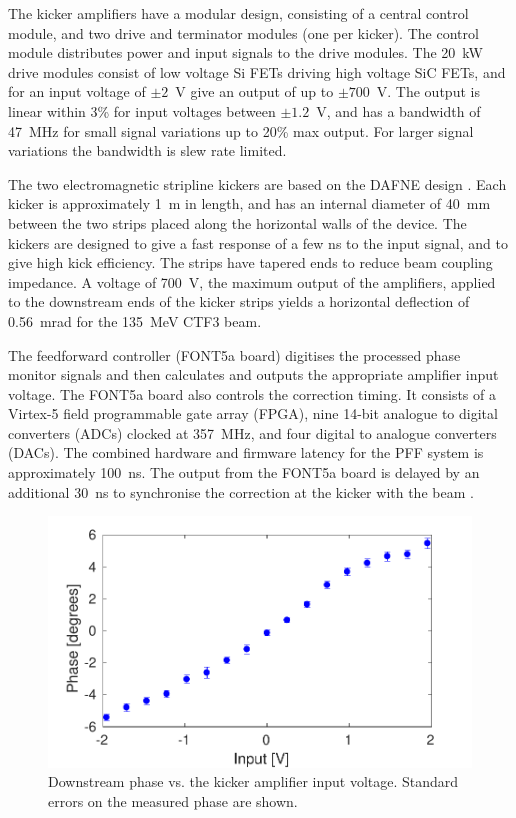 \documentclass[%
 reprint,
 superscriptaddress,
 amsmath,
 amssymb,
 prl,
]{revtex4-1}
\begin{document}
The kicker amplifiers \cite{RobertsThesis} have a modular design, 
consisting of a central control module, and two drive and terminator modules 
(one per kicker). The control module distributes power and input signals to the 
drive modules. The 20~kW drive modules consist of low voltage Si FETs driving 
high voltage SiC FETs, and for an input voltage of \(\pm2\)~V give an output of 
up to \(\pm700\)~V. The output is linear within 3\% for input voltages between 
\(\pm1.2\)~V, and has a bandwidth of 47~MHz for small signal variations up to 
20\% max output. For larger signal variations the bandwidth is slew rate 
limited.

The two electromagnetic stripline kickers \cite{kickerIPAC11} are based on the 
DAFNE design \cite{dafnePAC09}. Each kicker is approximately 1~m in length, and 
has an internal diameter of 40~mm between the two strips placed along the 
horizontal walls of the device. The kickers are designed to give a fast 
response of a few ns to the input signal, and to give high kick efficiency. The 
strips have tapered ends to reduce beam coupling impedance.
A voltage of 700~V, the maximum output of the amplifiers, applied to the 
downstream ends of the kicker strips yields a horizontal deflection of 
0.56~mrad for the 135~MeV CTF3 beam.

The feedforward controller (FONT5a board) \cite{RobertsThesis} digitises the 
processed phase monitor 
signals and then calculates and outputs the appropriate amplifier input 
voltage. The FONT5a board also controls the correction timing. It consists of a 
Virtex-5 field programmable gate array (FPGA), nine 14-bit analogue to digital 
converters (ADCs) clocked at 357~MHz, and four digital to analogue converters 
(DACs). The combined hardware and firmware latency for the PFF system is 
approximately 100~ns. The output from the FONT5a board is delayed by an 
additional 30~ns to synchronise the correction at the kicker with the beam 
\cite{RobertsThesis}.

\begin{figure}
	\includegraphics[width=\columnwidth]{figs/corrRange}
	\caption{\label{fig:corrRange}Downstream phase vs. the kicker amplifier 
		input voltage. Standard errors on the measured phase are shown.}
\end{figure}
\end{document}
